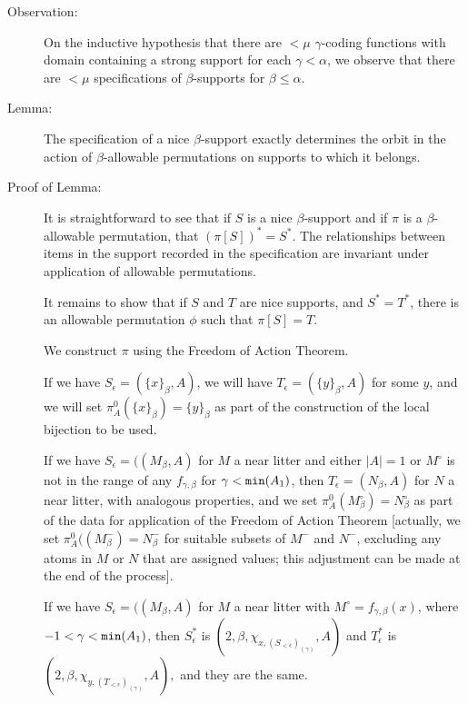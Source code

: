 \documentclass[112pt]{article}
\begin{document}
\begin{description}
\begin{comment}

Peter wants a definition of the type specification independent of the type support.  Use tags.   It's a good idea.

\end{comment}

\item[Observation:]  On the inductive hypothesis that there are $<\mu$ $\gamma$-coding functions with domain containing a strong support for each $\gamma<\alpha$, we observe that there are $<\mu$ specifications of $\beta$-supports for $\beta\leq \alpha$.

\item[Lemma:]  The specification of a nice $\beta$-support exactly determines the orbit in the action of $\beta$-allowable permutations on supports to which it belongs.

\item[Proof of Lemma:]

It is straightforward to see that if $S$ is a nice $\beta$-support and if $\pi$ is a $\beta$-allowable permutation, that $(\pi[S])^* = S^*$.  The relationships between items in the support recorded in the specification are invariant under application of allowable permutations.

It remains to show that if $S$ and $T$ are nice supports, and $S^*=T^*$, there is an allowable permutation $\phi$ such that $\pi[S]=T$.

We construct $\pi$ using the Freedom of Action Theorem.

If we have $S_\epsilon = (\{x\}_\beta,A)$, we will have $T_\epsilon = (\{y\}_\beta,A)$ for some $y$, and we will set $\pi^0_A(\{x\}_\beta) = \{y\}_\beta$ as part of the construction of the local bijection to be used.

If we have $S_\epsilon = ((M_\beta,A)$ for $M$ a near litter and either $|A|=1$ or $M^\circ$ is not in the range of any $f_{\gamma,\beta}$ for $\gamma<{\tt min}(A_1)$, then $T_\epsilon = (N_\beta,A)$ for $N$ a near litter, with analogous properties, and we set $\pi^0_A(M^\circ_\beta) = N^\circ_\beta$  as part of the data for application of the Freedom of Action Theorem [actually, we set $\pi^0_A((M^-_\beta) = N^-_\beta$  for suitable subsets of $M^-$ and $N^-$, excluding any atoms in $M$ or $N$ that are assigned values;  this adjustment can be made at the end of the process].


If we have $S_\epsilon= ((M_\beta,A)$ for $M$ a near litter with $M^\circ = f_{\gamma,\beta}(x)$, where $-1<\gamma<{\tt min}(A_1)$,
then $S^*_\epsilon$ is $(2,\beta,\chi_{x,(S_{<\epsilon})_{(\gamma)}},A)$ and $T^*_\epsilon$ is $(2,\beta,\chi_{y,(T_{<\epsilon})_{(\gamma)}},A),$ and they are the same.


\end{description}
\end{document}
